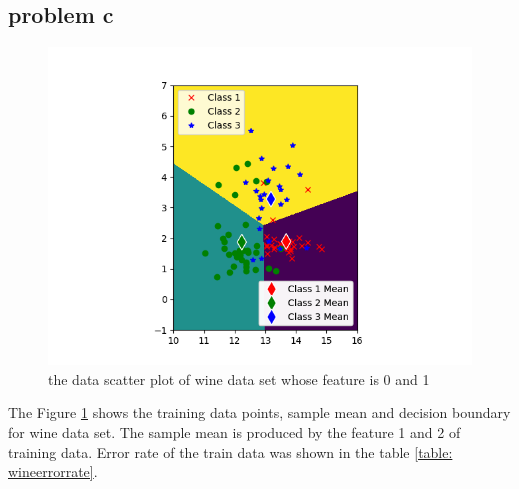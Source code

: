 \documentclass{article}
\begin{document}
	\subsection{problem c}
		\begin{figure}[hbt!]
		\includegraphics[width=\linewidth]{images/wine_feature01_train.png}	
		\caption{the data scatter plot of wine data set whose feature is 0 and 1}
		\label{fig:wine_feature01_train}
		\end{figure} 
	The Figure \ref{fig:wine_feature01_train} shows the training data points, sample mean and decision boundary for wine data set. The sample mean is produced by the feature 1 and 2 of training data. Error rate of the train data was shown in the table \ref{table: wineerrorrate}.                                
\end{document}
